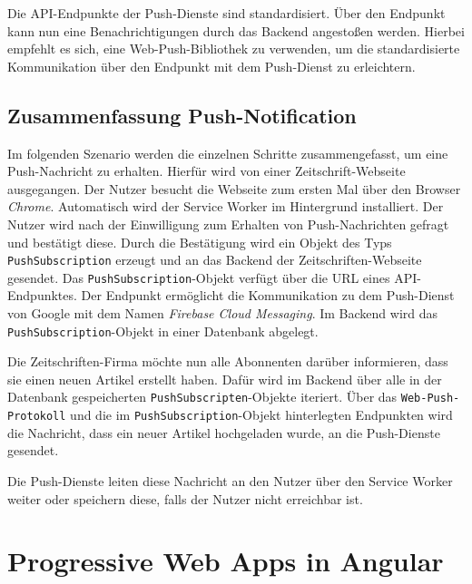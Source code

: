 Die API-Endpunkte der Push-Dienste sind standardisiert. Über den Endpunkt kann nun eine Benachrichtigungen durch das Backend angestoßen werden. Hierbei empfehlt es sich, eine Web-Push-Bibliothek zu verwenden, um die standardisierte Kommunikation über den Endpunkt mit dem Push-Dienst zu erleichtern. 

\subsection{Zusammenfassung Push-Notification}

Im folgenden Szenario werden die einzelnen Schritte zusammengefasst, um eine Push-Nachricht zu erhalten. Hierfür wird von einer Zeitschrift-Webseite ausgegangen. Der Nutzer besucht die Webseite zum ersten Mal über den Browser \textit{Chrome}. Automatisch wird der Service Worker im Hintergrund installiert. Der Nutzer wird nach der Einwilligung zum Erhalten von Push-Nachrichten gefragt und bestätigt diese. Durch die Bestätigung wird ein Objekt des Typs \texttt{PushSubscription} erzeugt und an das Backend der Zeitschriften-Webseite gesendet. Das \texttt{PushSubscription}-Objekt verfügt über die URL eines API-Endpunktes. Der Endpunkt ermöglicht die Kommunikation zu dem Push-Dienst von Google mit dem Namen \textit{Firebase Cloud Messaging}. 
Im Backend wird das \texttt{PushSubscription}-Objekt in einer Datenbank abgelegt. 

Die Zeitschriften-Firma möchte nun alle Abonnenten darüber informieren, dass sie einen neuen Artikel erstellt haben. Dafür wird im Backend über alle in der Datenbank gespeicherten \texttt{PushSubscripten}-Objekte iteriert. Über das \texttt{Web-Push-Protokoll} und die im \texttt{PushSubscription}-Objekt hinterlegten Endpunkten wird die Nachricht, dass ein neuer Artikel hochgeladen wurde, an die Push-Dienste gesendet. 

Die Push-Dienste leiten diese Nachricht an den Nutzer über den Service Worker weiter oder speichern diese, falls der Nutzer nicht erreichbar ist. 


\section{Progressive Web Apps in Angular}\label{sec:pwaAngular}

